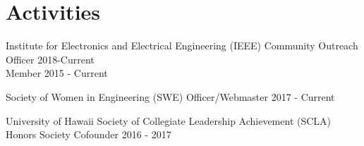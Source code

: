 \documentclass[]{hieudo-build}
\begin{document}
\begin{minipage}[t]{0.65\textwidth}


\section{Activities}
\vspace{\topsep} %
\small{}
\begin{tightemize}
\item Institute for Electronics and Electrical Engineering (IEEE) \newline      Community Outreach Officer 2018-Current \\
Member 2015 - Current
\item Society of Women in Engineering (SWE) Officer/Webmaster 2017 - Current \\ 
\item University of Hawaii Society of Collegiate Leadership Achievement (SCLA) Honors Society Cofounder 2016 - 2017
\end{tightemize}


\end{minipage} 
\end{document}
